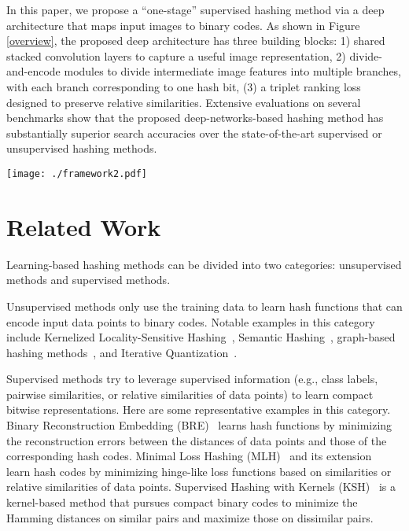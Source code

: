 \documentclass[10pt,twocolumn,letterpaper]{article}
\begin{document}
In this paper, we propose a ``one-stage'' supervised hashing method
via a deep architecture that maps input images to binary
codes. As shown in Figure \ref{overview}, the proposed deep
architecture has three building blocks:
 1) shared stacked
convolution layers to capture a useful image representation, 2)
divide-and-encode modules to divide intermediate image features
into multiple branches, with each branch corresponding to one hash
bit, (3) a triplet ranking loss~\cite{triplet} designed to preserve
relative similarities.
Extensive evaluations on several benchmarks
show that the proposed deep-networks-based hashing method has
substantially superior search accuracies over the state-of-the-art
supervised or unsupervised hashing methods.
\begin{figure*}\label{overview}
  \centering
  \texttt{[image: ./framework2.pdf]}
  \caption{Overview of the proposed deep architecture for hashing. The input to the proposed architecture is in the form of triplets, i.e., $(I,I^+,I^-)$ with a query image $I$ being more similar to an image $I^+$ than to another image $I^-$. Through the proposed architecture, the image triplets are first encoded into a triplet of image feature vectors by a shared stack of multiple convolution layers. Then, each image feature vector in the triplet is converted to a hash code by a divide-and-encode module. After that, these hash codes are used in a triplet ranking loss that aims to preserve relative similarities on images.}
\end{figure*}

\section{Related Work}
Learning-based hashing methods can be divided into two categories: unsupervised methods and supervised methods.

Unsupervised methods only use the training data to learn hash functions that can encode input data points to binary codes. Notable examples in this category include Kernelized Locality-Sensitive Hashing~\cite{KLSH}, Semantic Hashing~\cite{Semantic}, graph-based hashing methods~\cite{SH,AGH}, and Iterative Quantization~\cite{ITQ}.

Supervised methods try to leverage supervised information (e.g., class labels, pairwise similarities, or relative similarities of data points) to learn compact bitwise representations. Here are some representative examples in this category. Binary Reconstruction Embedding (BRE)~\cite{BRE} learns hash functions by minimizing the reconstruction errors between the distances of data points and those of the corresponding hash codes. Minimal Loss Hashing
(MLH)~\cite{MLH} and its extension~\cite{triplet} learn hash codes by minimizing hinge-like loss functions based on similarities or relative similarities of data points. Supervised Hashing with Kernels
(KSH)~\cite{KSH} is a kernel-based method that pursues compact binary codes to minimize the Hamming distances on similar pairs and maximize those on dissimilar pairs.
\end{document}
